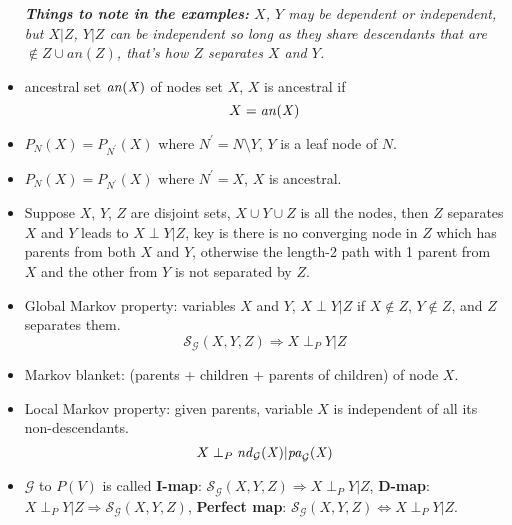 \begin{itemize}
    \textit{\textbf{Things to note in the examples:} $X$, $Y$ may be dependent or independent, but $X|Z$, $Y|Z$ can be independent so long as they share descendants that are $\notin Z\cup an(Z)$, that's how $Z$ separates $X$ and $Y$.}


\item ancestral set $\it{an}(X)$ of nodes set $X$, $X$ is ancestral if \[X = \it{an}(X)\] 

\item $P_N(X) = P_{N^{'}}(X)$ where $N^{'} = N\setminus Y$, $Y$ is a leaf node of $N$.

\item $P_N(X) = P_{N^{'}}(X)$ where $N^{'} = X$, $X$ is ancestral.

\item Suppose $X$, $Y$, $Z$ are disjoint sets, $X\cup Y\cup Z$ is all the nodes, then $Z$ separates $X$ and $Y$ leads to $X\perp Y|Z$, key is there is no converging node in $Z$ which has parents from both $X$ and $Y$, otherwise the length-2 path with 1 parent from $X$ and the other from $Y$ is not separated by $Z$.

\item Global Markov property: variables $X$ and $Y$, $X\perp Y|Z$ if $X\notin Z$, $Y\notin Z$, and $Z$ separates them. \[ \mathcal{S_G}(X,Y,Z) \Rightarrow X\perp_{P} Y|Z \]

\item Markov blanket: (parents + children + parents of children) of node $X$.

\item Local Markov property: given parents, variable $X$ is independent of all its non-descendants. \[ X\perp_{P} \it{nd}_\mathcal{G}(X)|\it{pa}_\mathcal{G}(X) \]

\item $\mathcal{G}$ to $P(V)$ is called \textbf{\color{cyan}I-map}: $\mathcal{S_G}(X,Y,Z) \Rightarrow X\perp_{P} Y|Z$, \textbf{\color{cyan}D-map}: $X\perp_{P} Y|Z \Rightarrow \mathcal{S_G}(X,Y,Z)$, \textbf{\color{cyan}Perfect map}: $\mathcal{S_G}(X,Y,Z) \Leftrightarrow X\perp_{P} Y|Z$.
\end{itemize}
